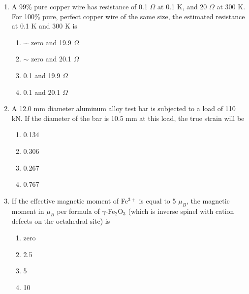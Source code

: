 \documentclass[a4paper,10pt]{article}
\begin{document}
\begin{enumerate}
\begin{multicols}{2}
\begin{enumerate}
\item P-4, Q-3, R-7, S-2
\item P-2, Q-5, R-6, S-1
\item P-4, Q-3, R-6, S-1
\item P-6, Q-5, R-7, S-6
\end{enumerate}
\end{multicols}

\item A 99\% pure copper wire has resistance of 0.1 $\Omega$ at 0.1 K, and 20 $\Omega$ at 300 K. For 100\% pure, perfect copper wire of the same size, the estimated resistance at 0.1 K and 300 K is
\hfill{}

\begin{multicols}{2}
\begin{enumerate}
\item $\sim$ zero and 19.9 $\Omega$
\item $\sim$ zero and 20.1 $\Omega$
\item 0.1 and 19.9 $\Omega$
\item 0.1 and 20.1 $\Omega$
\end{enumerate}
\end{multicols}

\item A 12.0 mm diameter aluminum alloy test bar is subjected to a load of 110 kN. If the diameter of the bar is 10.5 mm at this load, the true strain will be
\hfill{}

\begin{multicols}{4}
\begin{enumerate}
\item 0.134
\item 0.306
\item 0.267
\item 0.767
\end{enumerate}
\end{multicols}

\item If the effective magnetic moment of Fe$^{3+}$ is equal to 5 $\mu_B$, the magnetic moment in $\mu_B$ per formula of $\gamma$-Fe$_2$O$_3$ (which is inverse spinel with cation defects on the octahedral site) is
\hfill{}

\begin{multicols}{4}
\begin{enumerate}
\item zero
\item 2.5
\item 5
\item 10
\end{enumerate}
\end{multicols}


\end{enumerate}
\end{document}

